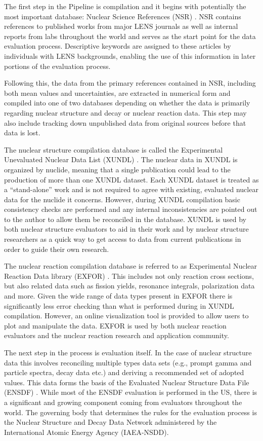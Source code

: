 \documentclass[letterpaper]{ar-1col}
\begin{document}
The first step in the Pipeline is compilation and it begins with potentially the most important database: Nuclear Science References (NSR) \cite{NSR}.  NSR contains references to published works from major LENS journals as well as internal reports from labs throughout the world and serves as the start point for the data evaluation process. Descriptive keywords are assigned to these articles by individuals with LENS backgrounds, enabling the use of this information in later portions of the evaluation process.   

Following this, the data from the primary references contained in NSR, including both mean values and uncertainties, are extracted in numerical form and compiled into one of two databases depending on whether the data is primarily regarding nuclear structure and decay or nuclear reaction data.   This step may also include tracking down unpublished data from original sources before that data is lost.

The nuclear structure compilation database is called the Experimental Unevaluated Nuclear Data List (XUNDL) \cite{XUN}.   The nuclear data in XUNDL is organized by nuclide, meaning that a single publication could lead to the production of more than one XUNDL dataset.  Each XUNDL dataset is treated as a “stand-alone” work and is not required to agree with existing, evaluated nuclear data for the nuclide it concerns.  However, during XUNDL compilation basic consistency checks are performed and any internal inconsistencies are pointed out to the author to allow them be reconciled in the database.  XUNDL is used by both nuclear structure evaluators to aid in their work and by nuclear structure researchers as a quick way to get access to data from current publications in order to guide their own research. 

The nuclear reaction compilation database is referred to as Experimental Nuclear Reaction Data library (EXFOR) \cite{EXF}.  This includes not only reaction cross sections, but also related data such as fission yields, resonance integrals, polarization data and more.  Given the wide range of data types present in EXFOR there is significantly less error checking than what is performed during in XUNDL compilation.  However, an online visualization tool is provided to allow users to plot and manipulate the data. EXFOR is used by both nuclear reaction evaluators and the nuclear reaction research and application community. 

The next step in the process is evaluation itself.  In the case of nuclear structure data this involves reconciling multiple types data sets (e.g., prompt gamma and particle spectra, decay data etc.) and deriving a recommended set of adopted values.  This data forms the basis of the Evaluated Nuclear Structure Data File (ENSDF) \cite{tepel1984ensdf}.  While most of the ENSDF evaluation is performed in the US, there is a significant and growing component coming from evaluators throughout the world.  The governing body that determines the rules for the evaluation process is the Nuclear Structure and Decay Data Network administered by the International Atomic Energy Agency (IAEA-NSDD).  
\end{document}
